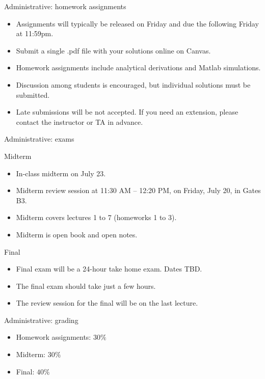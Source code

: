 \documentclass[10pt, aspectratio=169]{beamer}
\begin{document}
%
\begin{frame}{Administrative: homework assignments}

\begin{itemize}
	\item Assignments will typically be released on Friday and due the following Friday at 11:59pm.
	\item Submit a single .pdf file with your solutions online on Canvas.
	\item Homework assignments include analytical derivations and Matlab simulations.
	\item Discussion among students is encouraged, but individual solutions must be submitted.
	\item Late submissions will be not accepted. If you need an extension, please contact the instructor or TA in advance.
\end{itemize}

\end{frame}

%
\begin{frame}{Administrative: exams}
	
\begin{block}{Midterm}
	\begin{itemize} 
	\item In-class midterm on July 23. 
	\item Midterm review session at 11:30 AM -- 12:20 PM, on Friday, July 20, in Gates B3.
	\item Midterm covers lectures 1 to 7 (homeworks 1 to 3).
	\item Midterm is open book and open notes.
	\end{itemize}
\end{block}

\begin{block}{Final}
	\begin{itemize} 
	\item Final exam will be a 24-hour take home exam. Dates TBD.
	\item The final exam should take just a few hours.
	\item The review session for the final will be on the last lecture.
	\end{itemize}
\end{block}

\end{frame}

%
\begin{frame}{Administrative: grading}
	
	\begin{itemize}
		\item Homework assignments: $30\%$
		\item Midterm: $30\%$
		\item Final: $40\%$
	\end{itemize}
	
\end{frame}
\end{document}
